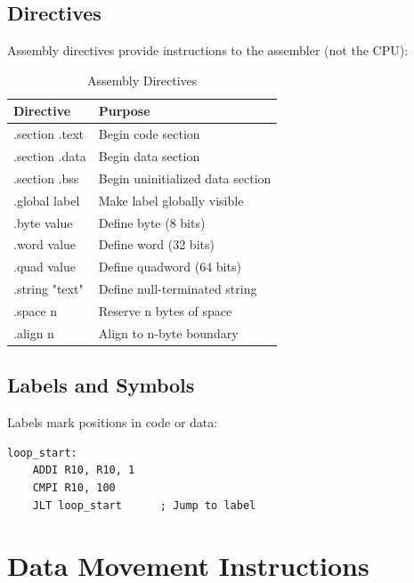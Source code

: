 \documentclass[12pt,a4paper,oneside]{book}
\begin{document}
\section{Directives}

Assembly directives provide instructions to the assembler (not the CPU):

\begin{table}[H]
\centering
\caption{Assembly Directives}
\label{tab:directives}
\begin{tabularx}{\textwidth}{|l|X|}
\hline
\textbf{Directive} & \textbf{Purpose} \\
\hline
.section .text & Begin code section \\
.section .data & Begin data section \\
.section .bss & Begin uninitialized data section \\
.global label & Make label globally visible \\
.byte value & Define byte (8 bits) \\
.word value & Define word (32 bits) \\
.quad value & Define quadword (64 bits) \\
.string "text" & Define null-terminated string \\
.space n & Reserve n bytes of space \\
.align n & Align to n-byte boundary \\
\hline
\end{tabularx}
\end{table}

\section{Labels and Symbols}

Labels mark positions in code or data:

\begin{lstlisting}[style=assembly]
loop_start:
    ADDI R10, R10, 1
    CMPI R10, 100
    JLT loop_start      ; Jump to label
\end{lstlisting}

\chapter{Data Movement Instructions}
\end{document}
